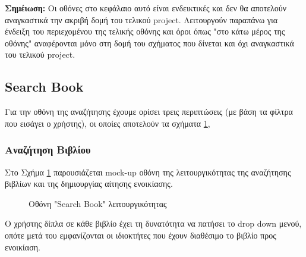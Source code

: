\documentclass[12pt,a4paper]{article}
\begin{document}
\textbf{Σημέιωση:} Οι οθόνες στο κεφάλαιο αυτό είναι ενδεικτικές και δεν θα αποτελούν αναγκαστικά την ακριβή δομή του τελικού project. Λειτουργούν παραπάνω για ένδειξη του περιεχομένου της τελικής οθόνης και όροι όπως "στο κάτω μέρος της οθόνης" αναφέρονται μόνο στη δομή του σχήματος που δίνεται και όχι αναγκαστικά του τελικού project.

\subsection{Search Book}

Για την οθόνη της αναζήτησης έχουμε ορίσει τρεις περιπτώσεις (με βάση τα φίλτρα που εισάγει ο χρήστης), οι οποίες αποτελούν τα σχήματα \ref{Οθόνη "Search Book" λειτουργικότητας},

\subsubsection{Αναζήτηση Βιβλίου}

Στο Σχήμα \ref{Οθόνη "Search Book" λειτουργικότητας} παρουσιάζεται mock-up οθόνη της λειτουργικότητας της αναζήτησης βιβλίων και της δημιουργίας αίτησης ενοικίασης.

\begin{figure}[H]
	\caption{Οθόνη "Search Book" λειτουργικότητας}
	\label{Οθόνη "Search Book" λειτουργικότητας}
\end{figure}

Ο χρήστης δίπλα σε κάθε βιβλίο έχει τη δυνατότητα να πατήσει το drop down μενού, οπότε μετά του εμφανίζονται οι ιδιοκτήτες που έχουν διαθέσιμο το βιβλίο προς ενοικίαση.
\end{document}
